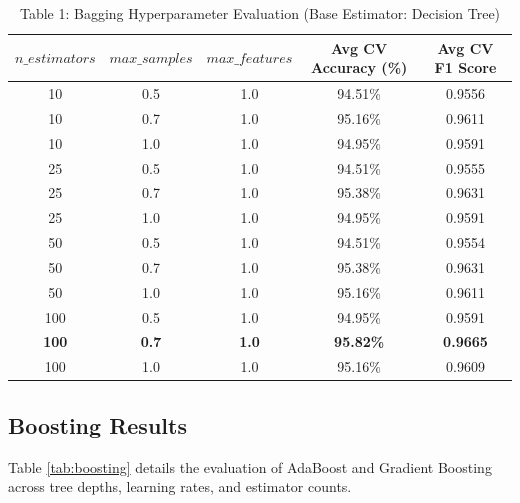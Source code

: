 \documentclass[12pt,a4paper]{article}
\begin{document}
\begin{table}[H]
\centering
\caption{Table 1: Bagging Hyperparameter Evaluation (Base Estimator: Decision Tree)}
\label{tab:bagging}
\begin{tabular}{|c|c|c|c|c|}
\hline
\textbf{$n\_estimators$} & \textbf{$max\_samples$} & \textbf{$max\_features$} & \textbf{Avg CV Accuracy (\%)} & \textbf{Avg CV F1 Score} \\ \hline
10 & 0.5 & 1.0 & 94.51\% & 0.9556 \\ \hline
10 & 0.7 & 1.0 & 95.16\% & 0.9611 \\ \hline
10 & 1.0 & 1.0 & 94.95\% & 0.9591 \\ \hline
25 & 0.5 & 1.0 & 94.51\% & 0.9555 \\ \hline
25 & 0.7 & 1.0 & 95.38\% & 0.9631 \\ \hline
25 & 1.0 & 1.0 & 94.95\% & 0.9591 \\ \hline
50 & 0.5 & 1.0 & 94.51\% & 0.9554 \\ \hline
50 & 0.7 & 1.0 & 95.38\% & 0.9631 \\ \hline
50 & 1.0 & 1.0 & 95.16\% & 0.9611 \\ \hline
100 & 0.5 & 1.0 & 94.95\% & 0.9591 \\ \hline
\textbf{100} & \textbf{0.7} & \textbf{1.0} & \textbf{95.82\%} & \textbf{0.9665} \\ \hline
100 & 1.0 & 1.0 & 95.16\% & 0.9609 \\ \hline
\end{tabular}
\end{table}

\subsection{Boosting Results}
Table \ref{tab:boosting} details the evaluation of AdaBoost and Gradient Boosting across tree depths, learning rates, and estimator counts.
\end{document}
